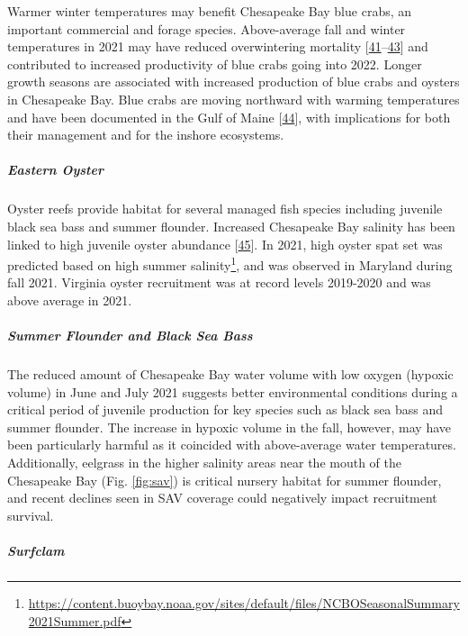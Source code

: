\documentclass[
  10pt,
]{article}
\begin{document}
Warmer winter temperatures may benefit Chesapeake Bay blue crabs, an
important commercial and forage species. Above-average fall and winter
temperatures in 2021 may have reduced overwintering mortality
{[}\protect\hyperlink{ref-bauer_temperature-_2010}{41}--\protect\hyperlink{ref-rome_linking_2005}{43}{]}
and contributed to increased productivity of blue crabs going into 2022.
Longer growth seasons are associated with increased production of blue
crabs and oysters in Chesapeake Bay. Blue crabs are moving northward
with warming temperatures and have been documented in the Gulf of Maine
{[}\protect\hyperlink{ref-johnson_savory_2015}{44}{]}, with implications
for both their management and for the inshore ecosystems.

\hypertarget{eastern-oyster}{%
\subparagraph{\texorpdfstring{\emph{Eastern
Oyster}}{Eastern Oyster}}\label{eastern-oyster}}

Oyster reefs provide habitat for several managed fish species including
juvenile black sea bass and summer flounder. Increased Chesapeake Bay
salinity has been linked to high juvenile oyster abundance
{[}\protect\hyperlink{ref-kimmel_relationship_2014}{45}{]}. In 2021,
high oyster spat set was predicted based on high summer
salinity\footnote{\url{https://content.buoybay.noaa.gov/sites/default/files/NCBOSeasonalSummary2021Summer.pdf}},
and was observed in Maryland during fall 2021. Virginia oyster
recruitment was at record levels 2019-2020 and was above average in
2021.

\hypertarget{summer-flounder-and-black-sea-bass}{%
\subparagraph{\texorpdfstring{\emph{Summer Flounder and Black Sea
Bass}}{Summer Flounder and Black Sea Bass}}\label{summer-flounder-and-black-sea-bass}}

The reduced amount of Chesapeake Bay water volume with low oxygen
(hypoxic volume) in June and July 2021 suggests better environmental
conditions during a critical period of juvenile production for key
species such as black sea bass and summer flounder. The increase in
hypoxic volume in the fall, however, may have been particularly harmful
as it coincided with above-average water temperatures. Additionally,
eelgrass in the higher salinity areas near the mouth of the Chesapeake
Bay (Fig. \ref{fig:sav}) is critical nursery habitat for summer
flounder, and recent declines seen in SAV coverage could negatively
impact recruitment survival.

\hypertarget{surfclam}{%
\subparagraph{\texorpdfstring{\emph{Surfclam}}{Surfclam}}\label{surfclam}}
\end{document}
